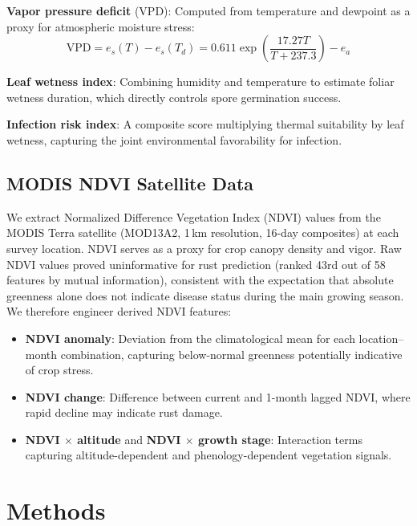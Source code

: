\documentclass[10pt,twocolumn,letterpaper]{article}
\begin{document}
\noindent\textbf{Vapor pressure deficit} (VPD): Computed from temperature and dewpoint as a proxy for atmospheric moisture stress:
\begin{equation}
\text{VPD} = e_s(T) - e_s(T_d) = 0.611 \exp\!\left(\frac{17.27T}{T+237.3}\right) - e_a
\end{equation}

\noindent\textbf{Leaf wetness index}: Combining humidity and temperature to estimate foliar wetness duration, which directly controls spore germination success.

\noindent\textbf{Infection risk index}: A composite score multiplying thermal suitability by leaf wetness, capturing the joint environmental favorability for infection.

\subsection{MODIS NDVI Satellite Data}

We extract Normalized Difference Vegetation Index (NDVI) values from the MODIS Terra satellite (MOD13A2, 1\,km resolution, 16-day composites) at each survey location. NDVI serves as a proxy for crop canopy density and vigor. Raw NDVI values proved uninformative for rust prediction (ranked 43rd out of 58 features by mutual information), consistent with the expectation that absolute greenness alone does not indicate disease status during the main growing season. We therefore engineer derived NDVI features:

\begin{itemize}
\item \textbf{NDVI anomaly}: Deviation from the climatological mean for each location--month combination, capturing below-normal greenness potentially indicative of crop stress.
\item \textbf{NDVI change}: Difference between current and 1-month lagged NDVI, where rapid decline may indicate rust damage.
\item \textbf{NDVI $\times$ altitude} and \textbf{NDVI $\times$ growth stage}: Interaction terms capturing altitude-dependent and phenology-dependent vegetation signals.
\end{itemize}

\section{Methods}
\label{sec:methods}
\end{document}
